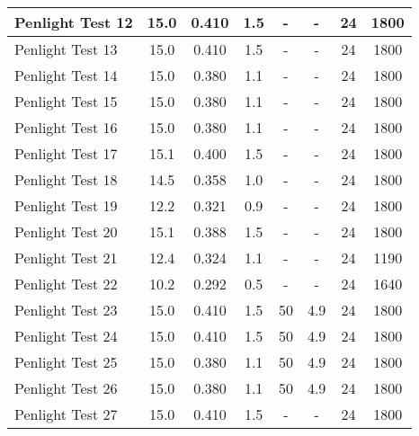 \begin{table}[!h]
\begin{center}
\begin{tabular}{|l|c|c|c|c|c|c|c|}
Penlight Test 12  &  15.0  &  0.410        &  1.5        &  -         &  -          &  24           &  1800       \\ \hline
Penlight Test 13  &  15.0  &  0.410        &  1.5        &  -         &  -          &  24           &  1800       \\ \hline
Penlight Test 14  &  15.0  &  0.380        &  1.1        &  -         &  -          &  24           &  1800       \\ \hline
Penlight Test 15  &  15.0  &  0.380        &  1.1        &  -         &  -          &  24           &  1800       \\ \hline
Penlight Test 16  &  15.0  &  0.380        &  1.1        &  -         &  -          &  24           &  1800       \\ \hline
Penlight Test 17  &  15.1  &  0.400        &  1.5        &  -         &  -          &  24           &  1800       \\ \hline
Penlight Test 18  &  14.5  &  0.358        &  1.0        &  -         &  -          &  24           &  1800       \\ \hline
Penlight Test 19  &  12.2  &  0.321        &  0.9        &  -         &  -          &  24           &  1800       \\ \hline
Penlight Test 20  &  15.1  &  0.388        &  1.5        &  -         &  -          &  24           &  1800       \\ \hline
Penlight Test 21  &  12.4  &  0.324        &  1.1        &  -         &  -          &  24           &  1190       \\ \hline
Penlight Test 22  &  10.2  &  0.292        &  0.5        &  -         &  -          &  24           &  1640       \\ \hline
Penlight Test 23  &  15.0  &  0.410        &  1.5        &  50        &  4.9        &  24           &  1800       \\ \hline
Penlight Test 24  &  15.0  &  0.410        &  1.5        &  50        &  4.9        &  24           &  1800       \\ \hline
Penlight Test 25  &  15.0  &  0.380        &  1.1        &  50        &  4.9        &  24           &  1800       \\ \hline
Penlight Test 26  &  15.0  &  0.380        &  1.1        &  50        &  4.9        &  24           &  1800       \\ \hline
Penlight Test 27  &  15.0  &  0.410        &  1.5        &  -         &  -          &  24           &  1800       \\ \hline

\end{tabular}
\end{center}
\end{table}
